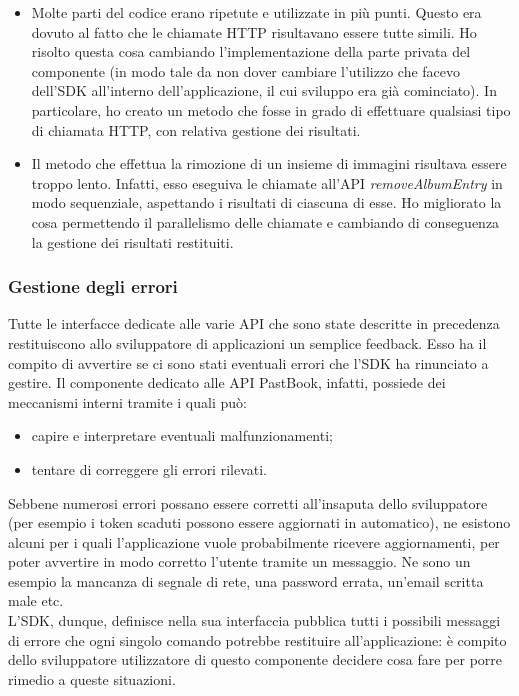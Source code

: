 				\begin{itemize}
					\item Molte parti del codice erano ripetute e utilizzate in più punti. Questo era dovuto al fatto che le
					chiamate HTTP risultavano essere tutte simili. Ho risolto questa cosa cambiando l'implementazione della parte
					privata del componente (in modo tale da non dover cambiare l'utilizzo che facevo dell'SDK all'interno
					dell'applicazione, il cui sviluppo era già cominciato). In particolare, ho creato un metodo che fosse in
					grado di effettuare qualsiasi tipo di chiamata HTTP, con relativa gestione dei risultati.
					\item Il metodo che effettua la rimozione di un insieme di immagini risultava essere troppo lento. Infatti,
					esso eseguiva le chiamate all'API \emph{removeAlbumEntry} in modo sequenziale, aspettando i risultati di
					ciascuna di esse. Ho migliorato la cosa permettendo il parallelismo delle chiamate e cambiando di conseguenza
					la gestione dei risultati restituiti.
				\end{itemize}
			\subsubsection{Gestione degli errori}
				Tutte le interfacce dedicate alle varie API che sono state descritte in precedenza restituiscono allo sviluppatore di
				applicazioni un semplice feedback. Esso ha il compito di avvertire se ci sono stati eventuali errori che l'SDK ha
				rinunciato a gestire. Il componente dedicato alle API PastBook, infatti, possiede dei meccanismi interni tramite i
				quali può:
				\begin{itemize} 
					\item capire e interpretare eventuali malfunzionamenti;
					\item tentare di correggere gli errori rilevati.
				\end{itemize}
				Sebbene numerosi errori possano essere corretti all'insaputa dello sviluppatore (per esempio i token scaduti possono
				essere aggiornati in automatico), ne esistono alcuni per i quali l'applicazione vuole probabilmente ricevere
				aggiornamenti, per poter avvertire in modo corretto l'utente tramite un messaggio. Ne sono un esempio la mancanza di
				segnale di rete, una password errata, un'email scritta male etc.\\
				L'SDK, dunque, definisce nella sua interfaccia pubblica tutti i possibili messaggi di errore che ogni singolo comando
				potrebbe restituire all'applicazione: è compito dello sviluppatore utilizzatore di questo componente decidere cosa
				fare per porre rimedio a queste situazioni.
